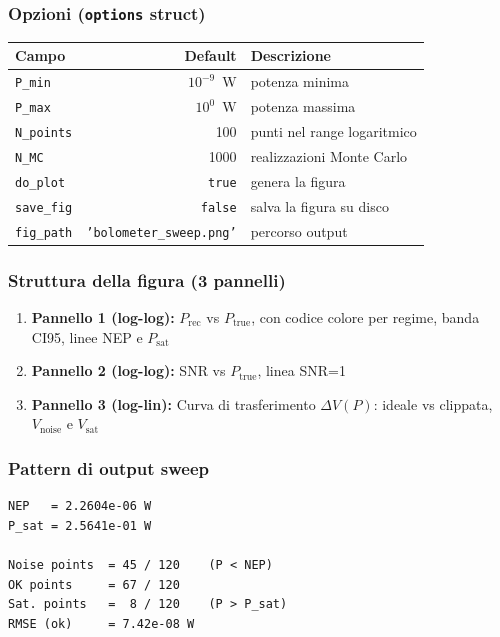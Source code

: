 \documentclass[11pt,a4paper]{article}
\begin{document}
\subsubsection*{Opzioni (\texttt{options} struct)}

\begin{center}
\begin{tabular}{lrl}
\toprule
Campo & Default & Descrizione \\
\midrule
\texttt{P\_min}    & $10^{-9}$~W & potenza minima \\
\texttt{P\_max}    & $10^{0}$~W  & potenza massima \\
\texttt{N\_points} & 100         & punti nel range logaritmico \\
\texttt{N\_MC}     & 1000        & realizzazioni Monte Carlo \\
\texttt{do\_plot}  & \texttt{true} & genera la figura \\
\texttt{save\_fig} & \texttt{false} & salva la figura su disco \\
\texttt{fig\_path} & \texttt{'bolometer\_sweep.png'} & percorso output \\
\bottomrule
\end{tabular}
\end{center}

\subsubsection*{Struttura della figura (3 pannelli)}

\begin{enumerate}[noitemsep]
  \item \textbf{Pannello 1 (log-log):} $P_{\text{rec}}$ vs $P_{\text{true}}$,
        con codice colore per regime, banda CI95, linee NEP e $P_{\text{sat}}$
  \item \textbf{Pannello 2 (log-log):} SNR vs $P_{\text{true}}$, linea SNR=1
  \item \textbf{Pannello 3 (log-lin):} Curva di trasferimento $\Delta V(P)$:
        ideale vs clippata, $V_{\text{noise}}$ e $V_{\text{sat}}$
\end{enumerate}

\subsubsection*{Pattern di output sweep}

\begin{lstlisting}[caption={Esempio di output testuale (120 punti, N\_MC=1000)}]
NEP   = 2.2604e-06 W
P_sat = 2.5641e-01 W

Noise points  = 45 / 120    (P < NEP)
OK points     = 67 / 120
Sat. points   =  8 / 120    (P > P_sat)
RMSE (ok)     = 7.42e-08 W
\end{lstlisting}
\end{document}
